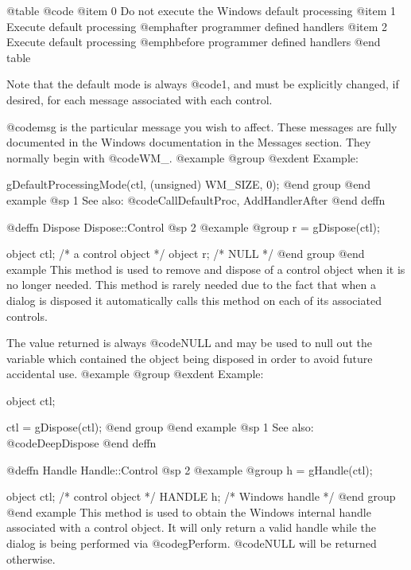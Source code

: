 @table @code
@item 0
Do not execute the Windows default processing
@item 1
Execute default processing @emph{after} programmer defined handlers
@item 2
Execute default processing @emph{before} programmer defined handlers
@end table

Note that the default mode is always @code{1}, and must be explicitly
changed, if desired, for each message associated with each control.

@code{msg} is the particular message you wish to affect.  These messages
are fully documented in the Windows documentation in the Messages
section.  They normally begin with @code{WM_}.
@example
@group
@exdent Example:

gDefaultProcessingMode(ctl, (unsigned) WM_SIZE, 0);
@end group
@end example
@sp 1
See also:  @code{CallDefaultProc, AddHandlerAfter}
@end deffn











@deffn {Dispose} Dispose::Control
@sp 2
@example
@group
r = gDispose(ctl);

object  ctl;   /*  a control object  */
object  r;     /*  NULL              */
@end group
@end example
This method is used to remove and dispose of a control object when it
is no longer needed.  This method is rarely needed due to the fact that
when a dialog is disposed it automatically calls this method on each of
its associated controls.

The value returned is always @code{NULL} and may be used to null out
the variable which contained the object being disposed in order to
avoid future accidental use.
@example
@group
@exdent Example:

object  ctl;

ctl = gDispose(ctl);
@end group
@end example
@sp 1
See also:  @code{DeepDispose}
@end deffn














@deffn {Handle} Handle::Control
@sp 2
@example
@group
h = gHandle(ctl);

object  ctl;    /*  control object   */
HANDLE  h;      /*  Windows handle  */
@end group
@end example
This method is used to obtain the Windows internal handle associated with
a control object.  It will only return a valid handle while the dialog
is being performed via @code{gPerform}.  @code{NULL} will be returned
otherwise.

